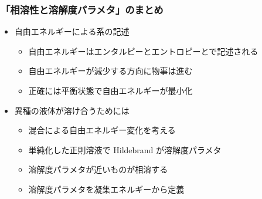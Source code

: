 \documentclass[12pt, dvipdfmx]{beamer}
\begin{document}
\begin{frame}
	\frametitle{「相溶性と溶解度パラメタ」のまとめ}
        \begin{boxnote}
            \vspace{-3mm}
            \begin{itemize}
                \item 自由エネルギーによる系の記述
                    \begin{itemize}
                        \item 自由エネルギーはエンタルピーとエントロピーとで記述される
						\item 自由エネルギーが減少する方向に物事は進む
						\item 正確には平衡状態で自由エネルギーが最小化
                    \end{itemize} 
                \item 異種の液体が溶け合うためには
                    \begin{itemize}
                        \item 混合による自由エネルギー変化を考える
                        \item 単純化した正則溶液で Hildebrand が溶解度パラメタ
                        \item 溶解度パラメタが近いものが相溶する
                        \item 溶解度パラメタを凝集エネルギーから定義
                    \end{itemize} 
            \end{itemize}
        \end{boxnote}
\end{frame}
\end{document}
